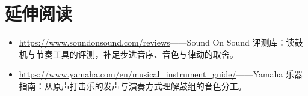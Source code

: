 \section*{延伸阅读}
\begin{itemize}[leftmargin=1.5em]
\item \url{https://www.soundonsound.com/reviews}——Sound On Sound 评测库：读鼓机与节奏工具的评测，补足步进音序、音色与律动的取舍。
\item \url{https://www.yamaha.com/en/musical_instrument_guide/}——Yamaha 乐器指南：从原声打击乐的发声与演奏方式理解鼓组的音色分工。
\end{itemize}
